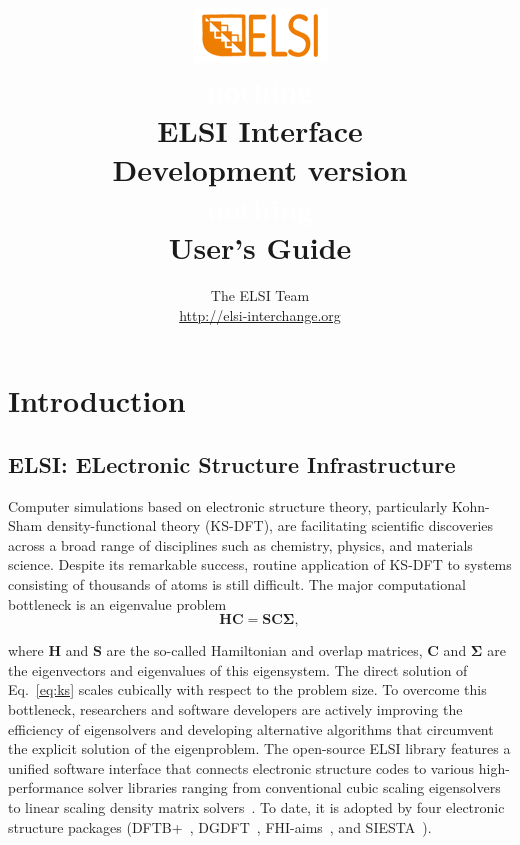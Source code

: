 \documentclass{report}
\newcommand{\tcw}[1]{\textcolor{white}{#1}}
\begin{document}
\title{\includegraphics[scale=0.07]{elsi_logo.png}\\ \tcw{nothing}\\ \textbf{ELSI Interface\\ Development version\\ \tcw{nothing}\\ User's Guide}}
\author{The ELSI Team\\ \url{http://elsi-interchange.org}}
\maketitle

\tableofcontents

\chapter{Introduction}
\section{ELSI: ELectronic Structure Infrastructure}
\label{sec:elsi}
Computer simulations based on electronic structure theory, particularly Kohn-Sham density-functional theory (KS-DFT), are facilitating scientific discoveries across a broad range of disciplines such as chemistry, physics, and materials science. Despite its remarkable success, routine application of KS-DFT to systems consisting of thousands of atoms is still difficult. The major computational bottleneck is an eigenvalue problem
\begin{equation}
\label{eq:ks}
\boldsymbol{H} \boldsymbol{C} = \boldsymbol{S} \boldsymbol{C} \boldsymbol{\Sigma},
\end{equation}

where $\boldsymbol{H}$ and $\boldsymbol{S}$ are the so-called Hamiltonian and overlap matrices, $\boldsymbol{C}$ and $\boldsymbol{\Sigma}$ are the eigenvectors and eigenvalues of this eigensystem. The direct solution of Eq.~\ref{eq:ks} scales cubically with respect to the problem size. To overcome this bottleneck, researchers and software developers are actively improving the efficiency of eigensolvers and developing alternative algorithms that circumvent the explicit solution of the eigenproblem. The open-source ELSI library features a unified software interface that connects electronic structure codes to various high-performance solver libraries ranging from conventional cubic scaling eigensolvers to linear scaling density matrix solvers~\cite{elsi_yu_2018}. To date, it is adopted by four electronic structure packages (DFTB+~\cite{dftb_aradi_2007}, DGDFT~\cite{dgdft_hu_2015}, FHI-aims~\cite{fhiaims_blum_2009}, and SIESTA~\cite{siesta_soler_2002}).
\end{document}
